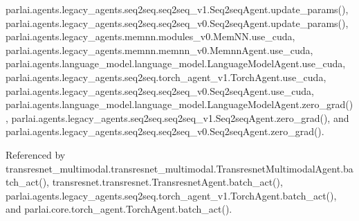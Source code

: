 parlai.\+agents.\+legacy\+\_\+agents.\+seq2seq.\+seq2seq\+\_\+v1.\+Seq2seq\+Agent.\+update\+\_\+params(), parlai.\+agents.\+legacy\+\_\+agents.\+seq2seq.\+seq2seq\+\_\+v0.\+Seq2seq\+Agent.\+update\+\_\+params(), parlai.\+agents.\+legacy\+\_\+agents.\+memnn.\+modules\+\_\+v0.\+Mem\+N\+N.\+use\+\_\+cuda, parlai.\+agents.\+legacy\+\_\+agents.\+memnn.\+memnn\+\_\+v0.\+Memnn\+Agent.\+use\+\_\+cuda, parlai.\+agents.\+language\+\_\+model.\+language\+\_\+model.\+Language\+Model\+Agent.\+use\+\_\+cuda, parlai.\+agents.\+legacy\+\_\+agents.\+seq2seq.\+torch\+\_\+agent\+\_\+v1.\+Torch\+Agent.\+use\+\_\+cuda, parlai.\+agents.\+legacy\+\_\+agents.\+seq2seq.\+seq2seq\+\_\+v0.\+Seq2seq\+Agent.\+use\+\_\+cuda, parlai.\+agents.\+language\+\_\+model.\+language\+\_\+model.\+Language\+Model\+Agent.\+zero\+\_\+grad(), parlai.\+agents.\+legacy\+\_\+agents.\+seq2seq.\+seq2seq\+\_\+v1.\+Seq2seq\+Agent.\+zero\+\_\+grad(), and parlai.\+agents.\+legacy\+\_\+agents.\+seq2seq.\+seq2seq\+\_\+v0.\+Seq2seq\+Agent.\+zero\+\_\+grad().



Referenced by transresnet\+\_\+multimodal.\+transresnet\+\_\+multimodal.\+Transresnet\+Multimodal\+Agent.\+batch\+\_\+act(), transresnet.\+transresnet.\+Transresnet\+Agent.\+batch\+\_\+act(), parlai.\+agents.\+legacy\+\_\+agents.\+seq2seq.\+torch\+\_\+agent\+\_\+v1.\+Torch\+Agent.\+batch\+\_\+act(), and parlai.\+core.\+torch\+\_\+agent.\+Torch\+Agent.\+batch\+\_\+act().

